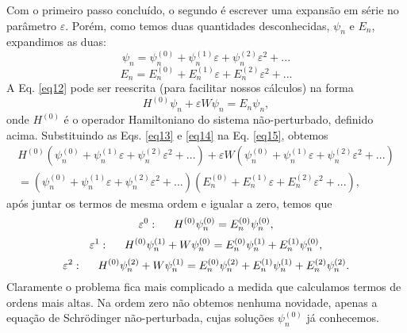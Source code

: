 \documentclass{article}
\begin{document}
Com o primeiro passo concluído, o segundo é escrever uma expansão em série no parâmetro $\varepsilon$. Porém, como temos duas quantidades desconhecidas, $\psi_n$ e $E_n$, expandimos as duas:
\begin{equation}
    \psi_n = \psi_n^{(0)} + \psi_n^{(1)}\varepsilon + \psi_n^{(2)}\varepsilon^2 + ...
    \label{eq13}
\end{equation}
\begin{equation}
    E_n = E_n^{(0)} + E_n^{(1)}\varepsilon + E_n^{(2)}\varepsilon^2 + ...
    \label{eq14}
\end{equation}
A Eq. \eqref{eq12} pode ser reescrita (para facilitar nossos cálculos) na forma
\begin{equation}
    H^{(0)}\psi_n + \varepsilon W \psi_n = E_n \psi_n,
    \label{eq15}
\end{equation}
onde $H^{(0)}$ é o operador Hamiltoniano do sistema não-perturbado, definido acima. Substituindo as Eqs. \eqref{eq13} e \eqref{eq14} na Eq. \eqref{eq15}, obtemos
\begin{multline}
    H^{(0)}(\psi_n^{(0)} + \psi_n^{(1)}\varepsilon + \psi_n^{(2)}\varepsilon^2 + ...) + \varepsilon W (\psi_n^{(0)} + \psi_n^{(1)}\varepsilon + \psi_n^{(2)}\varepsilon^2 + ...) \\
    = (\psi_n^{(0)} + \psi_n^{(1)}\varepsilon + \psi_n^{(2)}\varepsilon^2 + ...)(E_n^{(0)} + E_n^{(1)}\varepsilon + E_n^{(2)}\varepsilon^2 + ...),
\end{multline}
após juntar os termos de mesma ordem e igualar a zero, temos que
\begin{equation}
    \varepsilon^0: \hspace{0.5cm} H^{(0)}\psi_n^{(0)} = E_n^{(0)}\psi_n^{(0)},
\end{equation}
\begin{equation}
    \varepsilon^1: \hspace{0.5cm} H^{(0)}\psi_n^{(1)} + W\psi_n^{(0)} = E_n^{(0)}\psi_n^{(1)} + E_n^{(1)}\psi_n^{(0)},
    \label{eq18}
\end{equation}
\begin{equation}
    \varepsilon^2: \hspace{0.5cm} H^{(0)}\psi_n^{(2)} + W\psi_n^{(1)} = E_n^{(0)}\psi_n^{(2)} + E_n^{(1)}\psi_n^{(1)} + E_n^{(2)}\psi_n^{(2)}.
\end{equation}
Claramente o problema fica mais complicado a medida que calculamos termos de ordens mais altas. Na ordem zero não obtemos nenhuma novidade, apenas a equação de Schrödinger não-perturbada, cujas soluções $\psi_n^{(0)}$ já conhecemos. 
\end{document}
